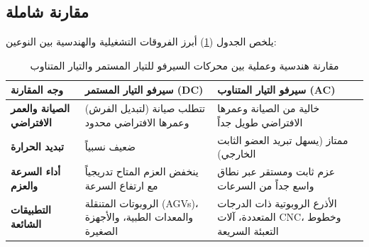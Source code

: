 \subsection{مقارنة شاملة}
يلخص الجدول (\ref{tab:ac_dc_comparison}) أبرز الفروقات التشغيلية والهندسية بين النوعين:

\begin{table}[h!]
    \centering
    \renewcommand{\arraystretch}{1.4}
    \begin{tabular}{|p{3.5cm}|p{5cm}|p{5cm}|}
        \hline
        \textbf{وجه المقارنة} & \textbf{سيرفو التيار المستمر (\textenglish{DC})} & \textbf{سيرفو التيار المتناوب (\textenglish{AC})} \\
        \hline
        \textbf{الصيانة والعمر الافتراضي} & تتطلب صيانة (لتبديل الفرش) وعمرها الافتراضي محدود & خالية من الصيانة وعمرها الافتراضي طويل جداً \\
        \hline
        \textbf{تبديد الحرارة} & ضعيف نسبياً & ممتاز (يسهل تبريد العضو الثابت الخارجي) \\
        \hline
        \textbf{أداء السرعة والعزم} & ينخفض العزم المتاح تدريجياً مع ارتفاع السرعة & عزم ثابت ومستقر عبر نطاق واسع جداً من السرعات \\
        \hline
        \textbf{التطبيقات الشائعة} & الروبوتات المتنقلة (\textenglish{AGVs})، والمعدات الطبية، والأجهزة الصغيرة & الأذرع الروبوتية ذات الدرجات المتعددة، آلات \textenglish{CNC}، وخطوط التعبئة السريعة \\
        \hline
    \end{tabular}
    \caption[مقارنة هندسية وعملية بين محركات السيرفو للتيار المستمر والتيار المتناوب]{\centering مقارنة هندسية وعملية بين محركات السيرفو للتيار المستمر والتيار المتناوب}
    \label{tab:ac_dc_comparison}
\end{table}
